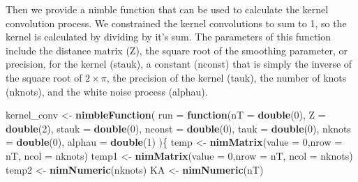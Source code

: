 \documentclass[11pt,]{article}
\newenvironment{Shaded}{\begin{snugshade}}{\end{snugshade}}
\newcommand{\KeywordTok}[1]{\textcolor[rgb]{0.13,0.29,0.53}{\textbf{#1}}}
\newcommand{\DataTypeTok}[1]{\textcolor[rgb]{0.13,0.29,0.53}{#1}}
\newcommand{\DecValTok}[1]{\textcolor[rgb]{0.00,0.00,0.81}{#1}}
\newcommand{\StringTok}[1]{\textcolor[rgb]{0.31,0.60,0.02}{#1}}
\newcommand{\ControlFlowTok}[1]{\textcolor[rgb]{0.13,0.29,0.53}{\textbf{#1}}}
\newcommand{\NormalTok}[1]{#1}
\begin{document}
Then we provide a nimble function that can be used to calculate the
kernel convolution process. We constrained the kernel convolutions to
sum to 1, so the kernel is calculated by dividing by it's sum. The
parameters of this function include the distance matrix (Z), the square
root of the smoothing parameter, or precision, for the kernel (stauk), a
constant (nconst) that is simply the inverse of the square root of
\(2 \times \pi\), the precision of the kernel (tauk), the number of
knots (nknots), and the white noise process (alphau).

\begin{Shaded}
\begin{Highlighting}[]
\NormalTok{kernel_conv <-}\StringTok{ }\KeywordTok{nimbleFunction}\NormalTok{(}
  \DataTypeTok{run =} \ControlFlowTok{function}\NormalTok{(}\DataTypeTok{nT =} \KeywordTok{double}\NormalTok{(}\DecValTok{0}\NormalTok{),}
                 \DataTypeTok{Z =} \KeywordTok{double}\NormalTok{(}\DecValTok{2}\NormalTok{),}
                 \DataTypeTok{stauk =} \KeywordTok{double}\NormalTok{(}\DecValTok{0}\NormalTok{),}
                 \DataTypeTok{nconst =} \KeywordTok{double}\NormalTok{(}\DecValTok{0}\NormalTok{),}
                 \DataTypeTok{tauk =} \KeywordTok{double}\NormalTok{(}\DecValTok{0}\NormalTok{),}
                 \DataTypeTok{nknots =} \KeywordTok{double}\NormalTok{(}\DecValTok{0}\NormalTok{),}
                 \DataTypeTok{alphau =} \KeywordTok{double}\NormalTok{(}\DecValTok{1}\NormalTok{)}
\NormalTok{  )\{}
\NormalTok{    temp <-}\StringTok{ }\KeywordTok{nimMatrix}\NormalTok{(}\DataTypeTok{value =} \DecValTok{0}\NormalTok{,}\DataTypeTok{nrow =}\NormalTok{ nT, }\DataTypeTok{ncol =}\NormalTok{ nknots)}
\NormalTok{    temp1 <-}\StringTok{ }\KeywordTok{nimMatrix}\NormalTok{(}\DataTypeTok{value =} \DecValTok{0}\NormalTok{,}\DataTypeTok{nrow =}\NormalTok{ nT, }\DataTypeTok{ncol =}\NormalTok{ nknots)}
\NormalTok{    temp2 <-}\StringTok{ }\KeywordTok{nimNumeric}\NormalTok{(nknots)}
\NormalTok{    KA <-}\StringTok{ }\KeywordTok{nimNumeric}\NormalTok{(nT)}


\end{Highlighting}
\end{Shaded}
\end{document}
